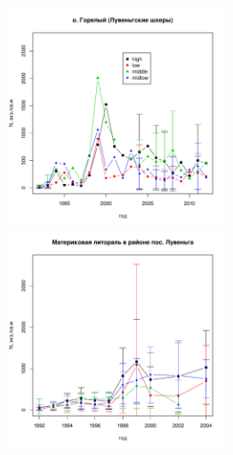 \documentclass[12pt, a4paper]{disser}
\begin{document}
	\begin{figure}[h]

	\begin{minipage}[b]{.46\linewidth}
	\begin{center}
		\includegraphics[width=65mm]{../White_Sea/Luvenga_Goreliy/N2_dynamic.pdf}
	\end{center}
	\end{minipage}
%
	\hfil %
%
	\begin{minipage}[b]{.46\linewidth}
	\begin{center}
		\includegraphics[width=65mm]{../White_Sea//Luvenga_II_razrez/N2_dynamic.pdf}
	\end{center}
	\end{minipage}
	



\end{figure}
\end{document}
